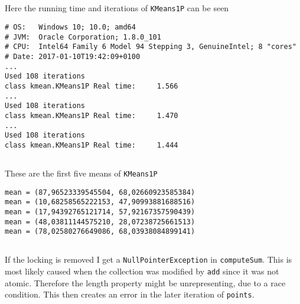 \subsection{}
Here the running time and iterations of \texttt{KMeans1P} can be seen
\begin{lstlisting}
# OS:   Windows 10; 10.0; amd64
# JVM:  Oracle Corporation; 1.8.0_101
# CPU:  Intel64 Family 6 Model 94 Stepping 3, GenuineIntel; 8 "cores"
# Date: 2017-01-10T19:42:09+0100
...
Used 108 iterations
class kmean.KMeans1P Real time:     1.566
...
Used 108 iterations
class kmean.KMeans1P Real time:     1.470
...
Used 108 iterations
class kmean.KMeans1P Real time:     1.444
\end{lstlisting}

\subsection{}
These are the first five means of \texttt{KMeans1P}
\begin{lstlisting}
mean = (87,96523339545504, 68,02660923585384)
mean = (10,68258565222153, 47,90993881688516)
mean = (17,94392765121714, 57,92167357590439)
mean = (48,03811144575210, 28,07238725661513)
mean = (78,02580276649086, 68,03938084899141)
\end{lstlisting}

\subsection{}
If the locking is removed I get a \texttt{NullPointerException} in \texttt{computeSum}. This is most likely caused when the collection was modified by \texttt{add} since it was not atomic. Therefore the length property might be unrepresenting, due to a race condition. This then creates an error in the later iteration of \texttt{points}.


